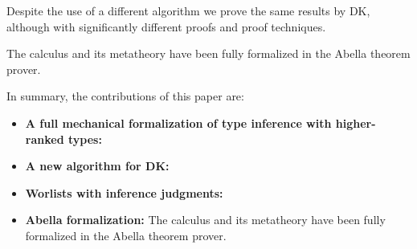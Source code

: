 Despite the use of a different algorithm we prove the
same results by DK, although with significantly different proofs and
proof techniques.  

The calculus and its metatheory
have been fully formalized in the Abella theorem prover\cite{AbellaDesc}. %

In summary, the contributions of this paper are:

\begin{itemize}

\item {\bf A full mechanical formalization of type inference with
    higher-ranked types:}

\item {\bf A new algorithm for DK:}

\item {\bf Worlists with inference judgments:}

\item {\bf Abella formalization:} The calculus and its metatheory
have been fully formalized in the Abella theorem prover\cite{AbellaDesc}.

\end{itemize}